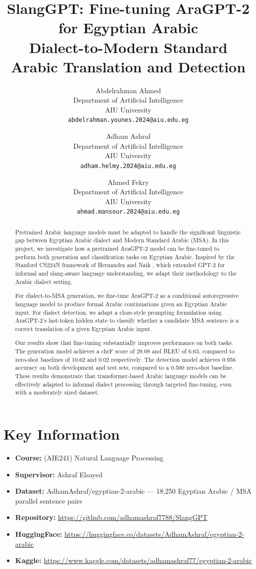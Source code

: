 \documentclass[11pt]{article}
\title{\textbf{SlangGPT: Fine-tuning AraGPT-2 for Egyptian Arabic\\
Dialect-to-Modern Standard Arabic Translation and Detection}}
\author{
  Abdelrahman Ahmed \\
  Department of Artificial Intelligence \\
  AIU University \\
  \texttt{abdelrahman.younes.2024@aiu.edu.eg}
  \and
  Adham Ashraf \\
  Department of Artificial Intelligence \\
  AIU University \\
  \texttt{adham.helmy.2024@aiu.edu.eg}
  \and
  Ahmed Fekry \\
  Department of Artificial Intelligence \\
  AIU University \\
  \texttt{ahmad.mansour.2024@aiu.edu.eg}
}
\date{}
\begin{document}
\maketitle

\begin{abstract}

\noindent Pretrained Arabic language models must be adapted to handle the significant linguistic gap between Egyptian Arabic dialect and Modern Standard Arabic (MSA). In this project, we investigate how a pretrained AraGPT-2 model can be fine-tuned to perform both generation and classification tasks on Egyptian Arabic. Inspired by the Stanford CS224N framework of Hernandez and Naik \cite{hernandez2025}, which extended GPT-2 for informal and slang-aware language understanding, we adapt their methodology to the Arabic dialect setting.

\noindent For dialect-to-MSA generation, we fine-tune AraGPT-2 as a conditional autoregressive language model to produce formal Arabic continuations given an Egyptian Arabic input. For dialect detection, we adapt a cloze-style prompting formulation using AraGPT-2's last-token hidden state to classify whether a candidate MSA sentence is a correct translation of a given Egyptian Arabic input.

\noindent Our results show that fine-tuning substantially improves performance on both tasks. The generation model achieves a chrF score of 29.08 and BLEU of 6.63, compared to zero-shot baselines of 10.62 and 0.02 respectively. The detection model achieves 0.956 accuracy on both development and test sets, compared to a 0.500 zero-shot baseline. These results demonstrate that transformer-based Arabic language models can be effectively adapted to informal dialect processing through targeted fine-tuning, even with a moderately sized dataset.
\end{abstract}

\section{Key Information}
\begin{itemize}[noitemsep]
  \item \textbf{Course:} (AIE241) Natural Language Processing
  \item \textbf{Supervisor:} Ashraf Elsayed
  \item \textbf{Dataset:} AdhamAshraf/egyptian-2-arabic \cite{ashraf2026} —
        18,250 Egyptian Arabic / MSA parallel sentence pairs
  \item \textbf{Repository:} \url{https://github.com/adhamashraf7788/SlangGPT}
  \item \textbf{HuggingFace:} \url{https://huggingface.co/datasets/AdhamAshraf/egyptian-2-arabic}
  \item \textbf{Kaggle:} \url{https://www.kaggle.com/datasets/adhamashraf77/egyptian-2-arabic}
\end{itemize}
\end{document}
